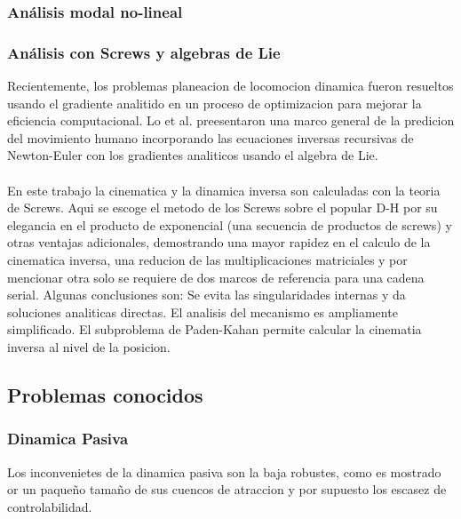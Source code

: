 \documentclass[10pt,onecolumn,twoside,letterpaper]{article}
\begin{document}
\subsubsection{An\'alisis modal no-lineal}
\subsubsection{An\'alisis con Screws y algebras de Lie}
Recientemente, los problemas planeacion de locomocion dinamica fueron resueltos usando el gradiente analitido en un proceso de optimizacion para mejorar la eficiencia computacional. Lo et al. preesentaron una marco general de la predicion del movimiento humano incorporando las ecuaciones inversas recursivas de Newton-Euler con los gradientes analiticos usando el algebra de Lie.\cite{Xiang2010}\\
\href{run:/home/jackmaster/Downloads/Doc Thesis/Walkers/+[2010 Y Xiang and J S  Arora and K Abdel-Malek] Art Physics-based modeling and simulation of human walking: a review of optimization -based and other approches.pdf}{
}\cite{Xiang2010}\\
En este trabajo la cinematica y la dinamica inversa son calculadas con la teoria de Screws. Aqui se escoge el metodo de los Screws sobre el popular D-H por su elegancia en el producto de exponencial (una secuencia de productos de screws) y otras ventajas adicionales, demostrando una mayor rapidez en el calculo de la cinematica inversa, una reducion de las multiplicaciones matriciales y por mencionar otra solo se requiere de dos marcos de referencia para una cadena serial. Algunas conclusiones son: Se evita las singularidades internas y da soluciones analiticas directas. El analisis del mecanismo es ampliamente simplificado. El subproblema de Paden-Kahan permite calcular la cinematia inversa al nivel de la posicion.\cite{Arbulu2008}
\subsection{Problemas conocidos}
\subsubsection{Dinamica Pasiva}
Los inconvenietes de la dinamica pasiva son la baja robustes, como es mostrado or un paque\~no tama\~no de sus cuencos de atraccion y por supuesto los escasez de controlabilidad.\cite{Verdaasdonk2009}\\
\href{run:/home/jackmaster/Downloads/Doc Thesis/Walkers/[2009 B W Verdaasdonk and H F J M Koopman and F C T van der Helm] Art Energy efficient walking with central pattern generators: from passive dynamic walking to biologically inspired control.pdf}{
}\cite{Verdaasdonk2009}
\end{document}
